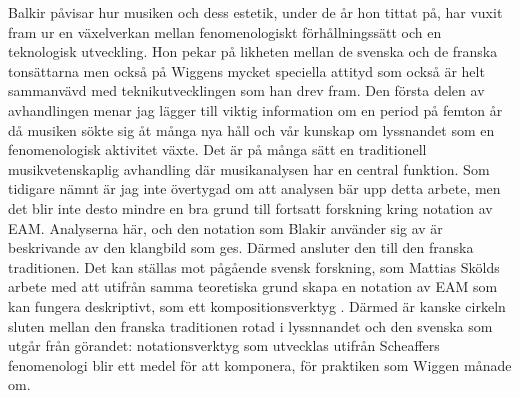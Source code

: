 \documentclass[11pt]{article}
\begin{document}
Balkir påvisar hur musiken och dess estetik, under de år hon tittat på, har vuxit fram ur en växelverkan mellan fenomenologiskt förhållningssätt och en teknologisk utveckling. Hon pekar på likheten mellan de svenska och de franska tonsättarna men också på Wiggens mycket speciella attityd som också är helt sammanvävd med teknikutvecklingen som han drev fram. Den första delen av avhandlingen menar jag lägger till viktig information om en period på femton år då musiken sökte sig åt många nya håll och vår kunskap om lyssnandet som en fenomenologisk aktivitet växte. Det är på många sätt en traditionell musikvetenskaplig avhandling där musikanalysen har en central funktion. Som tidigare nämnt är jag inte övertygad om att analysen bär upp detta arbete, men det blir inte desto mindre en bra grund till fortsatt forskning kring notation av EAM. Analyserna här, och den notation som Blakir använder sig av är beskrivande av den klangbild som ges. Därmed ansluter den till den franska traditionen. Det kan ställas mot pågående svensk forskning, som Mattias Skölds arbete med att utifrån samma teoretiska grund skapa en notation av EAM som kan fungera deskriptivt, som ett kompositionsverktyg \citep{skold2019}. Därmed är kanske cirkeln sluten mellan den franska traditionen rotad i lyssnnandet och den svenska som utgår från görandet: notationsverktyg som utvecklas utifrån Scheaffers fenomenologi blir ett medel för att komponera, för praktiken som Wiggen månade om.


\printbibliography[title=Referenser]
\end{document}
